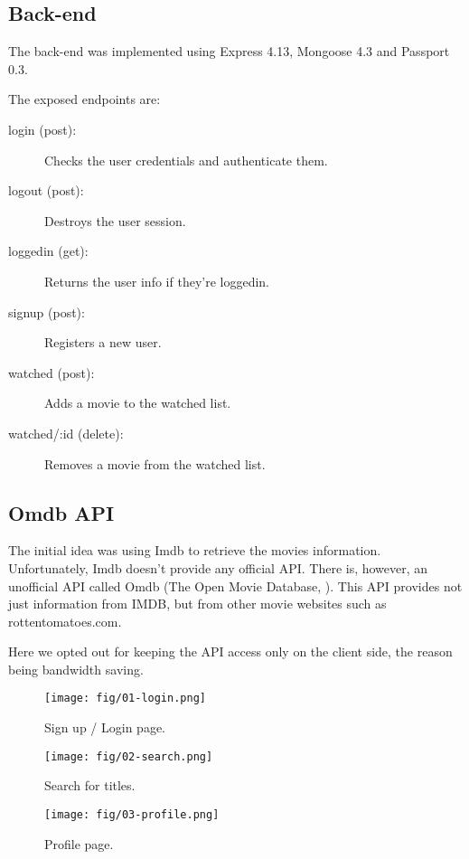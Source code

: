 \subsection{Back-end}

The back-end was implemented using Express 4.13, Mongoose 4.3 and Passport 0.3.

The exposed endpoints are:

\begin{description}
  \item[login (post):] Checks the user credentials and authenticate them.
  \item[logout (post):] Destroys the user session.
  \item[loggedin (get):] Returns the user info if they're loggedin.
  \item[signup (post):] Registers a new user.
  \item[watched (post):] Adds a movie to the watched list.
  \item[watched/:id (delete):] Removes a movie from the watched list.
\end{description}

\subsection{Omdb API} \label{sec:omdb}

The initial idea was using Imdb to retrieve the movies information.
Unfortunately, Imdb doesn't provide any official API. There is, however, an
unofficial API called Omdb (The Open Movie Database, \cite{omdb}). This API
provides not just information from IMDB, but from other movie websites such as
rottentomatoes.com.

Here we opted out for keeping the API access only on the client side, the
reason being bandwidth saving.

\begin{figure}[!htb]
\centering
\texttt{[image: fig/01-login.png]}
\caption{\label{fig:login}Sign up / Login page.}
\end{figure}

\begin{figure}[!htb]
\centering
\texttt{[image: fig/02-search.png]}
\caption{\label{fig:search}Search for titles.}
\end{figure}


\begin{figure}[!htb]
\centering
\texttt{[image: fig/03-profile.png]}
\caption{\label{fig:profile}Profile page.}
\end{figure}

